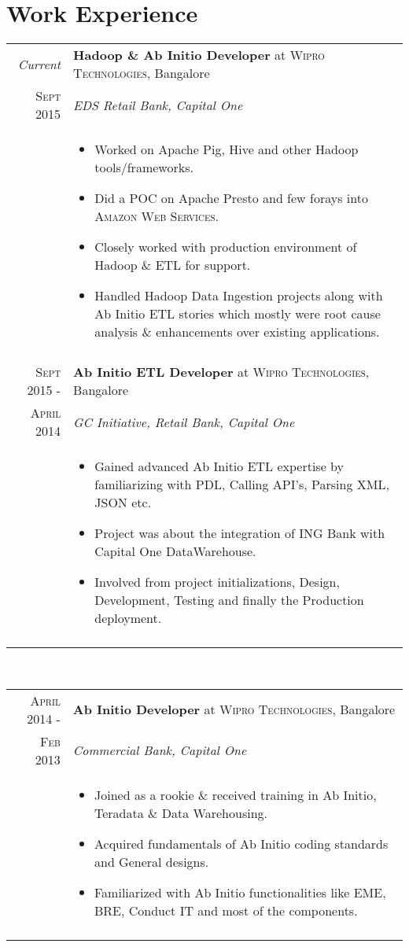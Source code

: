 \documentclass[a4paper,10pt]{article}
\begin{document}
\section{Work Experience}
\begin{tabular}{r|p{11cm}}
 \emph{Current} & \textbf{Hadoop \& Ab Initio Developer} at \textsc{Wipro Technologies}, Bangalore \\\textsc{Sept 2015}&\emph{EDS Retail Bank, Capital One}\\&

 \begin{itemize}
 \item Worked on Apache Pig, Hive and other Hadoop tools/frameworks.
 \item Did a \textsc{POC} on Apache Presto and few forays into \textsc{Amazon Web Services}. 
 \item Closely worked with production environment of Hadoop \& ETL for support.
 \item Handled Hadoop Data Ingestion projects along with Ab Initio ETL stories which mostly were root cause analysis \& enhancements over existing applications.
 \end{itemize}
 \\\multicolumn{2}{c}{} \\
 \textsc{Sept 2015 -} & \textbf{Ab Initio ETL Developer} at \textsc{Wipro Technologies}, Bangalore \\\textsc{April 2014}&\emph{GC Initiative, Retail Bank, Capital One}\\&\begin{itemize}
 \item Gained advanced Ab Initio ETL expertise by familiarizing with PDL, Calling API's, Parsing XML, JSON etc.
 \item Project was about the integration of ING Bank with Capital One DataWarehouse.
 \item Involved from project initializations, Design, Development, Testing and finally the Production deployment.
 \end{itemize}\\\multicolumn{2}{c}{}
 \end{tabular}
 \\
 \begin{tabular}{r|p{11cm}}
 \textsc{April 2014 -} & \textbf{Ab Initio Developer} at \textsc{Wipro Technologies}, Bangalore \\\textsc{Feb 2013}&\emph{Commercial Bank, Capital One}\\&\begin{itemize}
 \item Joined as a rookie \& received training in Ab Initio, Teradata \& Data Warehousing.
 \item Acquired fundamentals of Ab Initio coding standards and General designs.
 \item Familiarized with Ab Initio functionalities like EME, BRE, Conduct IT and most of the components.
 \end{itemize}\\\multicolumn{2}{c}{}
\end{tabular}
\end{document}
